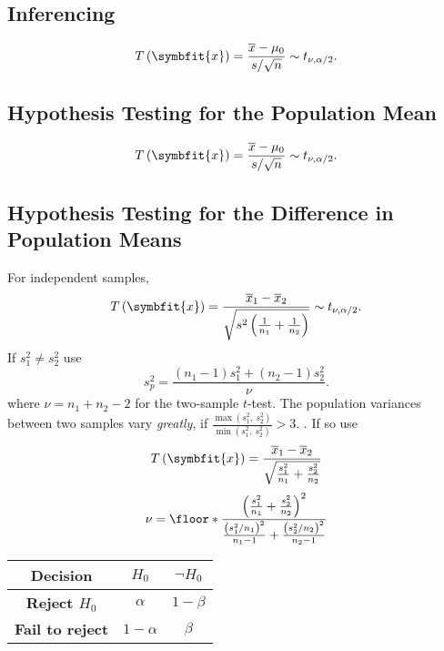\documentclass{article}
\begin{document}
\begin{multicols}{3}
\subsection{Inferencing}
\begin{equation*}
    T\left( \symbfit{x} \right) = \frac{\overline{x} - \mu_0}{s / \sqrt{n}} \sim t_{\nu, \alpha/2}.
\end{equation*}
\subsection{Hypothesis Testing for the Population Mean}
\begin{equation*}
    T\left( \symbfit{x} \right) = \frac{\overline{x} - \mu_0}{s/\sqrt{n}} \sim t_{\nu, \alpha/2}.
\end{equation*}
\subsection{Hypothesis Testing for the Difference in Population Means}
For independent samples,
\begin{equation*}
    T\left( \symbfit{x} \right) = \frac{\overline{x}_1 - \overline{x}_2}{\sqrt{s^2\left( \frac{1}{n_1} + \frac{1}{n_2} \right)}} \sim t_{\nu, \alpha/2}.
\end{equation*}
If \(s_1^2 \ne s_2^2\) use 
\begin{equation*}
    s_p^2 = \frac{\left( n_1 - 1 \right)s_1^2 + \left( n_2 - 1 \right)s_2^2}{\nu}.
\end{equation*}
where \(\nu = n_1 + n_2 - 2\) for the two-sample \(t\)-test.
The population variances between two samples vary \textit{greatly}, if
\(
    \frac{\max{\left( s_1^2,\: s_2^2 \right)}}{\min{\left( s_1^2,\: s_2^2 \right)}} > 3.
    \)
    . If so use
\begin{equation*}
    T\left( \symbfit{x} \right) = \frac{\overline{x}_1 - \overline{x}_2 }{\sqrt{\frac{s_1^2}{n_1} + \frac{s_2^2}{n_2}}}
\end{equation*}
\begin{equation*}
    \nu = \floor*{\frac{\left( \frac{s_1^2}{n_1} + \frac{s_2^2}{n_2} \right)^2}{\frac{\left( s_1^2 / n_1 \right)^2}{n_1 - 1} + \frac{\left( s_2^2 / n_2 \right)^2}{n_2 - 1}}}
\end{equation*}

        
\begin{minipage}{70mm}
\begin{table}[H]
    \centering
    \begin{tabular}{c|cc}
        \toprule
        \textbf{Decision}                  & \textbf{\(H_0\)}       & \textbf{\(\lnot H_0\)}      \\
        \midrule
        \textbf{Reject \(H_0\)}            & \(\alpha\)  & \(1 - \beta\)           \\
        \textbf{Fail to reject} & \(1 - \alpha\)                 & \(\beta\)  \\
        \bottomrule
    \end{tabular}
\end{table}
\end{minipage}


\end{multicols}
\end{document}
